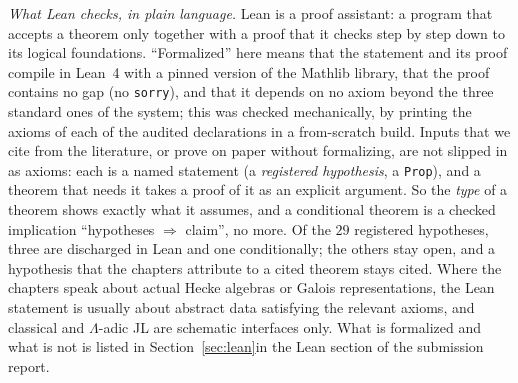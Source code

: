 \emph{What Lean checks, in plain language.} Lean is a proof assistant: a program that accepts a theorem only together with a proof
that it checks step by step down to its logical foundations. ``Formalized'' here means that the statement and its proof compile in Lean~4 with
a pinned version of the Mathlib library, that the proof contains no gap (no \texttt{sorry}), and that it depends on no axiom
beyond the three standard ones of the system; this was checked mechanically, by printing the axioms of each of the
\ifdefined\GateAudited\GateAudited{}\fi{} audited declarations in a from-scratch build. Inputs that we cite from the
literature, or prove on paper without formalizing, are not slipped in as axioms: each is a named statement (a \emph{registered
hypothesis}, a \texttt{Prop}), and a theorem that needs it takes a proof of it as an explicit argument. So the \emph{type} of a
theorem shows exactly what it assumes, and a conditional theorem is a checked implication ``hypotheses $\Rightarrow$ claim'', no
more. Of the $29$ registered hypotheses, three are discharged in Lean and one conditionally; the others stay open, and a hypothesis
that the chapters attribute to a cited theorem stays cited. Where the chapters speak about actual Hecke algebras or Galois
representations, the Lean statement is usually about abstract data satisfying the relevant axioms, and classical and
$\Lambda$-adic JL are schematic interfaces only. What is formalized and what is not is listed
\ifdefined\sOOsummary in Section~\ref{sec:lean}\else in the Lean section of the submission report\fi.
